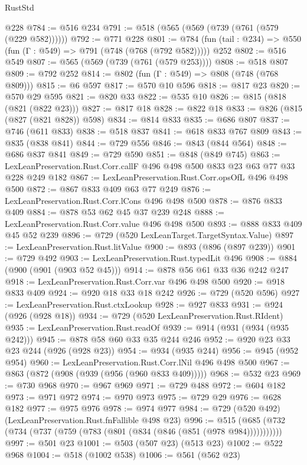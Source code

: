 \begin{lexlean}{RustStd}
\begin{coremodule}
    @228
@784 := @516 @234
@791 := @518 (@565 (@569 (@739 (@761 (@579 (@229 @582))))))
@792 := @771 @228
@801 := @784 (fun (tail : @234) => @550 (fun (Γ : @549) => @791 (@748 (@768 (@792 @582))))) @252
@802 := @516 @549
@807 := @565 (@569 (@739 (@761 (@579 @253))))
@808 := @518 @807
@809 := @792 @252
@814 := @802 (fun (Γ : @549) => @808 (@748 (@768 @809)))
@815 := @6 @597
@817 := @570 @10 @596
@818 := @817 @23
@820 := @570 @29 @595
@821 := @820 @33
@822 := @535 @10
@826 := @815 (@818 (@821 (@822 @23)))
@827 := @817 @18
@828 := @822 @18
@833 := @826 (@815 (@827 (@821 @828)) @598)
@834 := @814 @833
@835 := @686 @807
@837 := @746 (@611 @833)
@838 := @518 @837
@841 := @618 @833 @767 @809
@843 := @835 (@838 @841)
@844 := @729 @556
@846 := @843 (@844 @564)
@848 := @686 @837 @841
@849 := @729 @590
@851 := @848 (@849 @745)
@863 := LexLeanPreservation.Rust.Corr.callF @496 @498 @500 @833 @23 @63 @77 @33 @228 @249 @182
@867 := LexLeanPreservation.Rust.Corr.opsOfL @496 @498 @500
@872 := @867 @833 @409 @63 @77 @249
@876 := LexLeanPreservation.Rust.Corr.lCons @496 @498 @500
@878 := @876 @833 @409
@884 := @878 @53 @62 @45 @37 @239 @248
@888 := LexLeanPreservation.Rust.Corr.value @496 @498 @500
@893 := @888 @833 @409 @45 @52 @239
@896 := @729 (@520 LexLeanTarget.TargetSyntax.Value)
@897 := LexLeanPreservation.Rust.litValue
@900 := @893 (@896 (@897 @239))
@901 := @729 @492
@903 := LexLeanPreservation.Rust.typedLit @496
@908 := @884 (@900 (@901 (@903 @52 @45)))
@914 := @878 @56 @61 @33 @36 @242 @247
@918 := LexLeanPreservation.Rust.Corr.var @496 @498 @500
@920 := @918 @833 @409
@924 := @920 @18 @33 @18 @242
@926 := @729 (@520 @596)
@927 := LexLeanPreservation.Rust.ctxLookup
@928 := @927 @833
@931 := @924 (@926 (@928 @18))
@934 := @729 (@520 LexLeanPreservation.Rust.RIdent)
@935 := LexLeanPreservation.Rust.readOf
@939 := @914 (@931 (@934 (@935 @242)))
@945 := @878 @58 @60 @33 @35 @244 @246
@952 := @920 @23 @33 @23 @244 (@926 (@928 @23))
@954 := @934 (@935 @244)
@956 := @945 (@952 @954)
@960 := LexLeanPreservation.Rust.Corr.lNil @496 @498 @500
@967 := @863 (@872 (@908 (@939 (@956 (@960 @833 @409)))))
@968 := @532 @23
@969 := @730 @968
@970 := @967 @969
@971 := @729 @488
@972 := @604 @182
@973 := @971 @972
@974 := @970 @973
@975 := @729 @29
@976 := @628 @182
@977 := @975 @976
@978 := @974 @977
@984 := @729 (@520 @492) (LexLeanPreservation.Rust.fnFallible @498 @23)
@996 := @515 (@685 (@732 (@734 (@737 (@759 (@783 (@801 (@834 (@846 (@851 (@978 @984)))))))))))
@997 := @501 @23
@1001 := @503 (@507 @23) (@513 @23)
@1002 := @522 @968
@1004 := @518 (@1002 @538)
@1006 := @561 (@562 @23)

\end{coremodule}
\end{lexlean}
